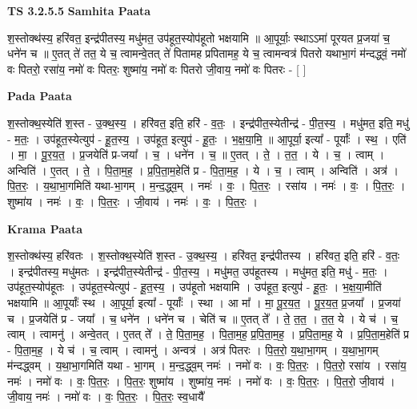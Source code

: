 \documentclass[17pt]{extarticle}
\begin{document}
\textbf{TS 3.2.5.5 } \newline
\textbf{Samhita Paata} \newline

श॒स्तोक्थ॑स्य॒ हरि॑वत॒ इन्द्र॑पीतस्य॒ मधु॑मत॒ उप॑हूत॒स्योप॑हूतो भक्षयामि ॥ आ॒पूर्याः॒ स्थाऽऽमा॑ पूरयत प्र॒जया॑ च॒ धने॑न च ॥ ए॒तत् ते॑ तत॒ ये च॒ त्वामन्वे॒तत् ते॑ पितामह प्रपितामह॒ ये च॒ त्वामन्वत्र॑ पितरो यथाभा॒गं म॑न्दद्ध्वं॒ नमो॑ वः पितरो॒ रसा॑य॒ नमो॑ वः पितरः॒ शुष्मा॑य॒ नमो॑ वः पितरो जी॒वाय॒ नमो॑ वः पितरः - [  ] \newline

\textbf{Pada Paata} \newline

श॒स्तोक्थ॒स्येति॑ श॒स्त - उ॒क्थ॒स्य॒ । हरि॑वत॒ इति॒ हरि॑ - व॒तः॒ । इन्द्र॑पीत॒स्येतीन्द्र॑ - पी॒त॒स्य॒ । मधु॑मत॒ इति॒ मधु॑ - म॒तः॒ । उप॑हूत॒स्येत्युप॑ - हू॒त॒स्य॒ । उप॑हूत॒ इत्युप॑ - हू॒तः॒ । भ॒क्ष॒या॒मि॒ ॥ आ॒पूर्या॒ इत्या᳚ - पूर्याः᳚ । स्थ॒ । एति॑ । मा॒ । पू॒र॒य॒त॒ । प्र॒जयेति॑ प्र-जया᳚ । च॒ । धने॑न । च॒ ॥ ए॒तत् । ते॒ । त॒त॒ । ये । च॒ । त्वाम् । अन्विति॑ । ए॒तत् । ते॒ । पि॒ता॒म॒ह॒ । प्र॒पि॒ता॒म॒हेति॑ प्र - पि॒ता॒म॒ह॒ । ये । च॒ । त्वाम् । अन्विति॑ । अत्र॑ । पि॒त॒रः॒ । य॒था॒भा॒गमिति॑ यथा-भा॒गम् । म॒न्द॒द्ध्व॒म् । नमः॑ । वः॒ । पि॒त॒रः॒ । रसा॑य । नमः॑ । वः॒ । पि॒त॒रः॒ । शुष्मा॑य । नमः॑ । वः॒ । पि॒त॒रः॒ । जी॒वाय॑ । नमः॑ । वः॒ । पि॒त॒रः॒ ।  \newline


\textbf{Krama Paata} \newline

श॒स्तोक्थ॑स्य॒ हरि॑वतः । श॒स्तोक्थ॒स्येति॑ श॒स्त - उ॒क्थ॒स्य॒ । हरि॑वत॒ इन्द्र॑पीतस्य । हरि॑वत॒ इति॒ हरि॑ - व॒तः॒ । इन्द्र॑पीतस्य॒ मधु॑मतः । इन्द्र॑पीत॒स्येतीन्द्र॑ - पी॒त॒स्य॒ । मधु॑मत॒ उप॑हूतस्य । मधु॑मत॒ इति॒ मधु॑ - म॒तः॒ । उप॑हूत॒स्योप॑हूतः । उप॑हूत॒स्येत्युप॑ - हू॒त॒स्य॒ । उप॑हूतो भक्षयामि । उप॑हूत॒ इत्युप॑ - हू॒तः॒ । भ॒क्ष॒या॒मीति॑ भक्षयामि ॥ आ॒पूर्याः᳚ स्थ । आ॒पूर्या॒ इत्या᳚ - पूर्याः᳚ । स्था । आ मा᳚ । मा॒ पू॒र॒य॒त॒ । पू॒र॒य॒त॒ प्र॒जया᳚ । प्र॒जया॑ च । प्र॒जयेति॑ प्र - जया᳚ । च॒ धने॑न । धने॑न च । चेति॑ च ॥ ए॒तत् ते᳚ । ते॒ त॒त॒ । त॒त॒ ये । ये च॑ । च॒ त्वाम् । त्वामनु॑ । अन्वे॒तत् । ए॒तत् ते᳚ । ते॒ पि॒ता॒म॒ह॒ । पि॒ता॒म॒ह॒ प्र॒पि॒ता॒म॒ह॒ । प्र॒पि॒ता॒म॒ह॒ ये । प्र॒पि॒ता॒म॒हेति॑ प्र - पि॒ता॒म॒ह॒ । ये च॑ । च॒ त्वाम् । त्वामनु॑ । अन्वत्र॑ । अत्र॑ पितरः । पि॒त॒रो॒ य॒था॒भा॒गम् । य॒था॒भा॒गम् म॑न्दद्ध्वम् । य॒था॒भा॒गमिति॑ यथा - भा॒गम् । म॒न्द॒द्ध्व॒म् नमः॑ । नमो॑ वः । वः॒ पि॒त॒रः॒ । पि॒त॒रो॒ रसा॑य । रसा॑य॒ नमः॑ । नमो॑ वः । वः॒ पि॒त॒रः॒ । पि॒त॒रः॒ शुष्मा॑य । शुष्मा॑य॒ नमः॑ । नमो॑ वः । वः॒ पि॒त॒रः॒ । पि॒त॒रो॒ जी॒वाय॑ । जी॒वाय॒ नमः॑ । नमो॑ वः । वः॒ पि॒त॒रः॒ । पि॒त॒रः॒ स्व॒धायै᳚ \newline
\end{document}

